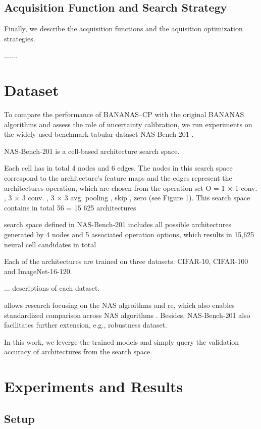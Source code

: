 \documentclass[a4paper,oneside,bibliography=totoc]{scrbook}
\begin{document}
\section{Acquisition Function and Search Strategy}
\label{sec:acq}
Finally, we describe the acquisition functions and the aquisition optimization strategies.




.......
\chapter{Dataset}
\label{Dataset}
To compare the performance of BANANAS--CP with the original BANANAS algorithms and assess the role of uncertainty calibration, we run experiments on the widely used benchmark tabular dataset NAS-Bench-201 \cite{dong2020nasbench201}.

NAS-Bench-201 is a cell-based architecture search space. 

 Each cell has in total 4 nodes and 6 edges. The nodes in this search space correspond to the architecture’s feature maps and the edges represent the architectures operation, which are chosen from the operation set O = {1 × 1 conv. , 3 × 3 conv. , 3 × 3 avg. pooling , skip , zero} (see Figure 1). This search space contains in total 56 = 15 625 architectures

 search space defined in NAS-Bench-201 includes all possible architectures generated by 4 nodes and 5 associated operation options, which results in 15,625 neural cell candidates in total
 
Each of the architectures are trained on three datasets: CIFAR-10, CIFAR-100 and ImageNet-16-120. 

... descriptions of each dataset.



allows research focusing on the NAS algroithms and re, which also enables standardized comparison across NAS algorithms . Besides, NAS-Bench-201 also facilitates further extension, e.g., robustness dataset.


In this work, we leverge the trained models and simply query the validation accuracy of architectures from the search space.


\chapter{Experiments and Results}
\section{Setup}
\end{document}
